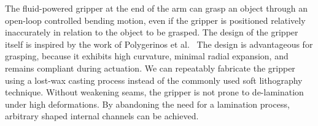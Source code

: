 

The fluid-powered gripper at the end of the arm can grasp an object through an open-loop controlled bending motion, even if the gripper is positioned relatively inaccurately in relation to the object to be grasped.
The design of the gripper itself is inspired by the work of Polygerinos et al.~\cite{polygerinos2013towards}
The design is advantageous for grasping, because it exhibits high curvature, minimal radial expansion, and remains compliant during actuation. 
We can repeatably fabricate the gripper using a lost-wax casting process instead of the commonly used soft lithography technique.%
Without weakening seams, the gripper is not prone to de-lamination under high deformations. 
By abandoning the need for a lamination process, arbitrary shaped internal channels can be achieved. 

